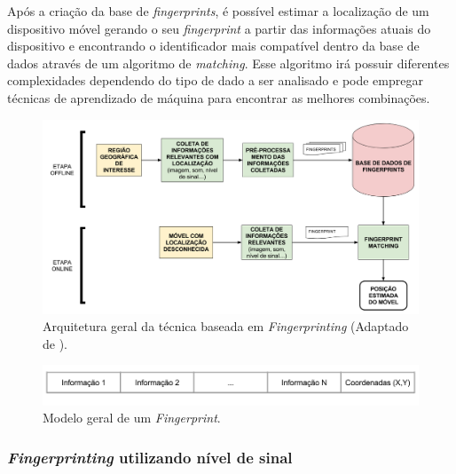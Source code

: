 \documentclass[12pt]{article}
\begin{document}
            Após a criação da base de \textit{fingerprints}, é possível estimar a localização de um dispositivo móvel gerando o seu \textit{fingerprint} a partir das informações atuais do dispositivo e encontrando o identificador mais compatível dentro da base de dados através de um algoritmo de \textit{matching}. Esse algoritmo irá possuir diferentes complexidades dependendo do tipo de dado a ser analisado e 
            pode empregar técnicas de aprendizado de máquina para encontrar as melhores combinações.
            
            \begin{figure}[H]
                \centering
                \includegraphics[width=16cm]{images/arquiteturaGeral.png}\par
                \caption{Arquitetura geral da técnica baseada em  \textit{Fingerprinting} (Adaptado de \cite{surveyFingerprinting2016}).}
                \label{fig:arquiteturaGeralFingerprinting}
            \end{figure}
            
            \begin{figure}[H]
                \centering
                \includegraphics[width=14cm]{images/fingerprintUnico.png}\par
                \caption{Modelo geral de um \textit{Fingerprint}.}
                \label{fig:fingerprintUnico}
            \end{figure}
            
            \subsubsection{\textit{Fingerprinting} utilizando nível de sinal}
            \label{sec:arquiteturaFingerprintingRSSI}
            
\end{document}
